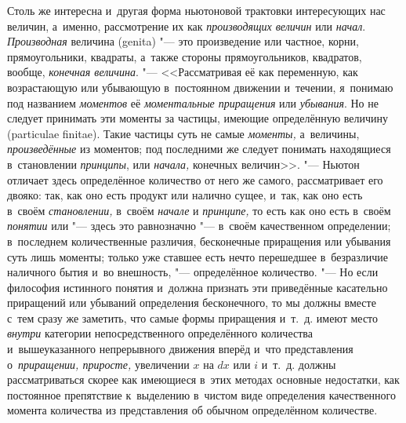 Столь же интересна и~другая форма ньютоновой трактовки интересующих нас
величин, а~именно, рассмотрение их как {\em производящих величин} или
{\em начал}. {\em Производная} величина (genita) "--- это произведение или
частное, корни, прямоугольники, квадраты, а~также стороны прямоугольников,
квадратов, вообще, {\em конечная величина}. "--- <<Рассматривая её как
переменную, как возрастающую или убывающую в~постоянном движении и~течении,
я~понимаю под названием {\em моментов} её {\em моментальные приращения} или
{\em убывания}. Но не следует принимать эти моменты за частицы, имеющие
определённую величину (particulae finitae). Такие частицы суть не самые
{\em моменты,} а~величины, {\em произведённые} из моментов; под последними же
следует понимать находящиеся в~становлении {\em принципы}, или {\em начала,}
конечных величин>>. "--- Ньютон отличает здесь определённое количество от него
же самого, рассматривает его двояко: так, как оно есть продукт или налично
сущее, и~так, как оно есть в~своём {\em становлении,} в~своём {\em начале} и
{\em принципе,} то есть как оно есть в~своём {\em понятии} или "--- здесь это
равнозначно "--- в~своём качественном определении; в~последнем количественные
различия, бесконечные приращения или убывания суть лишь моменты; только уже
ставшее есть нечто перешедшее в~безразличие наличного бытия и~во внешность,
"--- определённое количество. "--- Но если философия истинного понятия и~должна
признать эти приведённые касательно приращений или убываний определения
бесконечного, то мы должны вместе с~тем сразу же заметить, что самые формы
приращения и~т.~д. имеют место {\em внутри} категории непосредственного
определённого количества и~вышеуказанного непрерывного движения вперёд и~что
представления о~{\em приращении, приросте,} увеличении $x$ на
$dx$ или $i$ и~т.~д. должны рассматриваться скорее как имеющиеся в~этих
методах основные недостатки, как постоянное препятствие к~выделению в~чистом
виде определения качественного момента количества из представления об обычном
определённом количестве.

